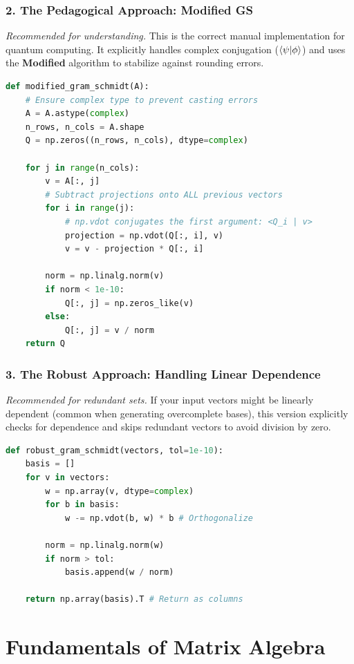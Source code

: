 \documentclass[12pt]{article}
\begin{document}
\subsubsection*{2. The Pedagogical Approach: Modified GS}
\textit{Recommended for understanding.} This is the correct manual implementation for quantum computing. It explicitly handles complex conjugation ($\braket{\psi}{\phi}$) and uses the \textbf{Modified} algorithm to stabilize against rounding errors.

\begin{lstlisting}[language=Python]
def modified_gram_schmidt(A):
    # Ensure complex type to prevent casting errors
    A = A.astype(complex)
    n_rows, n_cols = A.shape
    Q = np.zeros((n_rows, n_cols), dtype=complex)
    
    for j in range(n_cols):
        v = A[:, j]
        # Subtract projections onto ALL previous vectors
        for i in range(j):
            # np.vdot conjugates the first argument: <Q_i | v>
            projection = np.vdot(Q[:, i], v) 
            v = v - projection * Q[:, i]
            
        norm = np.linalg.norm(v)
        if norm < 1e-10: 
            Q[:, j] = np.zeros_like(v)
        else:
            Q[:, j] = v / norm
    return Q
\end{lstlisting}

\subsubsection*{3. The Robust Approach: Handling Linear Dependence}
\textit{Recommended for redundant sets.} If your input vectors might be linearly dependent (common when generating overcomplete bases), this version explicitly checks for dependence and skips redundant vectors to avoid division by zero.

\begin{lstlisting}[language=Python]
def robust_gram_schmidt(vectors, tol=1e-10):
    basis = []
    for v in vectors:
        w = np.array(v, dtype=complex)
        for b in basis:
            w -= np.vdot(b, w) * b # Orthogonalize
            
        norm = np.linalg.norm(w)
        if norm > tol:
            basis.append(w / norm)
            
    return np.array(basis).T # Return as columns
\end{lstlisting}


\break

\section{Fundamentals of Matrix Algebra}
\end{document}

